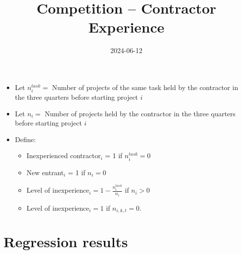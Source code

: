 \documentclass[
]{article}
\title{Competition -- Contractor Experience}
\author{}
\date{\vspace{-2.5em}2024-06-12}
\providecommand{\tightlist}{%
  \setlength{\itemsep}{0pt}\setlength{\parskip}{0pt}}
\begin{document}
\maketitle

\begin{itemize}
\item
  Let \(n^{task}_{i}=\) Number of projects of the same task held by the
  contractor in the three quarters before starting project \(i\)
\item
  Let \(n_{i}=\) Number of projects held by the contractor in the three
  quarters before starting project \(i\)
\item
  Define:

  \begin{itemize}
  \tightlist
  \item
    Inexperienced contractor\(_i\) = 1 if \(n^{task}_{i}=0\)
  \item
    New entrant\(_i\) = 1 if \(n_{i}=0\)
  \item
    Level of inexperience\(_{i}= 1 - \frac{n^{task}_{i}}{n_{i}}\) if
    \(n_{i}>0\)
  \item
    Level of inexperience\(_{i}= 1\) if \(n_{i,k,t}=0\).
  \end{itemize}
\end{itemize}

\hypertarget{regression-results}{%
\section{Regression results}\label{regression-results}}
\end{document}
